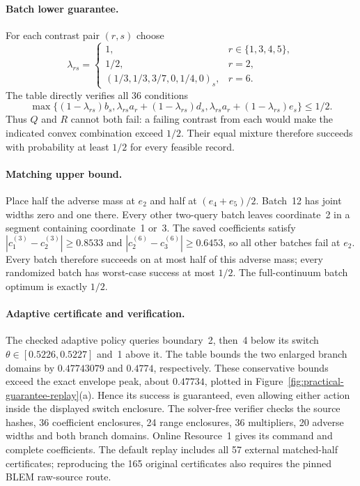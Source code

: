 \paragraph{Batch lower guarantee.}
For each contrast pair $(r,s)$ choose
\[
 \lambda_{rs}=\begin{cases}
 1,&r\in\{1,3,4,5\},\\
 1/2,&r=2,\\
 (1/3,1/3,3/7,0,1/4,0)_s,&r=6.
 \end{cases}
\]
The table directly verifies all 36 conditions
\[
 \max\{(1-\lambda_{rs})b_s,
 \lambda_{rs}a_r+(1-\lambda_{rs})d_s,
 \lambda_{rs}a_r+(1-\lambda_{rs})e_s\}\leq1/2.
\]
Thus $Q$ and $R$ cannot both fail: a failing contrast from each would make
the indicated convex combination exceed $1/2$.  Their equal mixture
therefore succeeds with probability at least $1/2$ for every feasible record.

\paragraph{Matching upper bound.}
Place half the adverse mass at $e_2$ and half at $(e_4+e_5)/2$.
Batch~12 has joint widths zero and one there.  Every other two-query
batch leaves coordinate~2 in a segment containing coordinate~1 or~3.
The saved coefficients satisfy
$|c^{(3)}_1-c^{(3)}_2|\geq0.8533$ and
$|c^{(6)}_2-c^{(6)}_3|\geq0.6453$, so all other batches fail at $e_2$.
Every batch therefore succeeds on at most half of this adverse mass;
every randomized batch has worst-case success at most $1/2$.
The full-continuum batch optimum is exactly $1/2$.

\paragraph{Adaptive certificate and verification.}
The checked adaptive policy queries boundary~2, then~4 below its switch
$\theta\in[0.5226,0.5227]$ and~1 above it.  The table bounds the two
enlarged branch domains by $0.47743079$ and $0.4774$, respectively.
These conservative bounds exceed the exact envelope peak, about $0.47734$,
plotted in Figure~\ref{fig:practical-guarantee-replay}(a).
Hence its success is guaranteed, even allowing either action inside the
displayed switch enclosure.
The solver-free verifier checks the source hashes, 36 coefficient enclosures,
24 range enclosures, 36 multipliers, 20 adverse widths and both branch domains.
Online Resource~1 gives its command and complete coefficients. The default
replay includes all 57 external matched-half certificates; reproducing the
165 original certificates also requires the pinned BLEM raw-source route.
